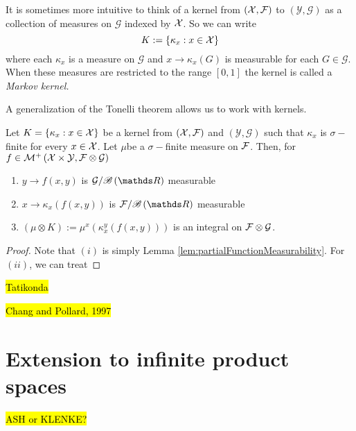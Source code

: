 \begin{rem*}
It is sometimes more intuitive to think of a kernel from $\left(\mathcal{X},\mathcal{F}\right)$
to $\left(\mathcal{Y},\mathcal{G}\right)$ as a collection of measures
on $\mathcal{G}$ indexed by $\mathcal{X}$. So we can write
\[
K:=\left\{ \kappa_{x}:x\in\mathcal{X}\right\} 
\]
where each $\kappa_{x}$ is a measure on $\mathcal{G}$ and $x\to\kappa_{x}\left(G\right)$
is measurable for each $G\in\mathcal{G}$. When these measures are
restricted to the range $\left[0,1\right]$ the kernel is called a
\emph{Markov kernel.}
\end{rem*}
A generalization of the Tonelli theorem allows us to work with kernels.
\begin{thm}
\label{thm:tonelliKernels}Let $K=\left\{ \kappa_{x}:x\in\mathcal{X}\right\} $
be a kernel from $\left(\mathcal{X},\mathcal{F}\right)$ and $\left(\mathcal{Y},\mathcal{G}\right)$
such that $\kappa_{x}$ is $\sigma-$finite for every $x\in\mathcal{X}$. Let
$\mu$be a $\sigma-$finite measure on $\mathcal{F}$. Then, for $f\in\mathcal{M}^{+}\left(\mathcal{X}\times\mathcal{Y},\mathcal{F}\otimes\mathcal{G}\right)$

\begin{enumerate}[label=(\roman*),leftmargin=.1\linewidth,rightmargin=.4\linewidth]
\item $y \to f\left(x,y\right)$ is $\mathcal{G}/\borel\left(\R\right)$ measurable
\item $x \to \kappa_x\left(f\left(x,y\right)\right)$ is $\mathcal{F}/\borel\left(\R\right)$ measurable
\item $\left(\mu \otimes K\right) := \mu^x\left(\kappa_x^y\left(f\left(x,y\right)\right)\right)$ is an integral on $\mathcal{F}\otimes\mathcal{G}$.
\end{enumerate}
\end{thm}

\begin{proof}
Note that $(i)$ is simply Lemma \ref{lem:partialFunctionMeasurability}.
For $\left(ii\right)$, we can treat
\end{proof}
\hl{Tatikonda}

\hl{Chang and Pollard, 1997}

\section{Extension to infinite product spaces}

\hl{ASH or KLENKE?}
